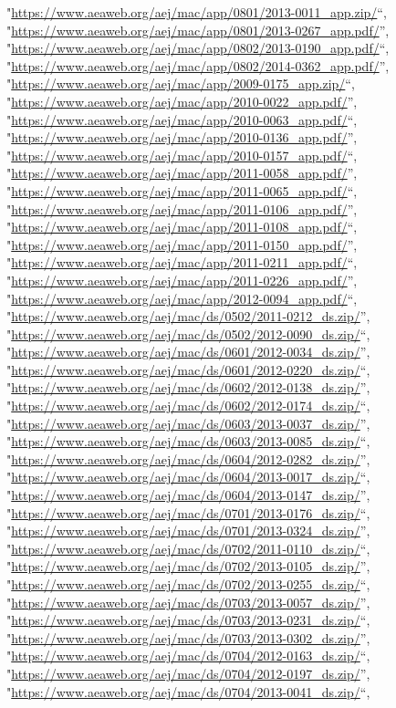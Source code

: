 \documentclass[]{article}
\begin{document}
\begin{itemize}
  "\url{https://www.aeaweb.org/aej/mac/app/0801/2013-0011_app.zip/}``,
  "\url{https://www.aeaweb.org/aej/mac/app/0801/2013-0267_app.pdf/}'',
  "\url{https://www.aeaweb.org/aej/mac/app/0802/2013-0190_app.pdf/}``,
  "\url{https://www.aeaweb.org/aej/mac/app/0802/2014-0362_app.pdf/}'',
  "\url{https://www.aeaweb.org/aej/mac/app/2009-0175_app.zip/}``,
  "\url{https://www.aeaweb.org/aej/mac/app/2010-0022_app.pdf/}'',
  "\url{https://www.aeaweb.org/aej/mac/app/2010-0063_app.pdf/}``,
  "\url{https://www.aeaweb.org/aej/mac/app/2010-0136_app.pdf/}'',
  "\url{https://www.aeaweb.org/aej/mac/app/2010-0157_app.pdf/}``,
  "\url{https://www.aeaweb.org/aej/mac/app/2011-0058_app.pdf/}'',
  "\url{https://www.aeaweb.org/aej/mac/app/2011-0065_app.pdf/}``,
  "\url{https://www.aeaweb.org/aej/mac/app/2011-0106_app.pdf/}'',
  "\url{https://www.aeaweb.org/aej/mac/app/2011-0108_app.pdf/}``,
  "\url{https://www.aeaweb.org/aej/mac/app/2011-0150_app.pdf/}'',
  "\url{https://www.aeaweb.org/aej/mac/app/2011-0211_app.pdf/}``,
  "\url{https://www.aeaweb.org/aej/mac/app/2011-0226_app.pdf/}'',
  "\url{https://www.aeaweb.org/aej/mac/app/2012-0094_app.pdf/}``,
  "\url{https://www.aeaweb.org/aej/mac/ds/0502/2011-0212_ds.zip/}'',
  "\url{https://www.aeaweb.org/aej/mac/ds/0502/2012-0090_ds.zip/}``,
  "\url{https://www.aeaweb.org/aej/mac/ds/0601/2012-0034_ds.zip/}'',
  "\url{https://www.aeaweb.org/aej/mac/ds/0601/2012-0220_ds.zip/}``,
  "\url{https://www.aeaweb.org/aej/mac/ds/0602/2012-0138_ds.zip/}'',
  "\url{https://www.aeaweb.org/aej/mac/ds/0602/2012-0174_ds.zip/}``,
  "\url{https://www.aeaweb.org/aej/mac/ds/0603/2013-0037_ds.zip/}'',
  "\url{https://www.aeaweb.org/aej/mac/ds/0603/2013-0085_ds.zip/}``,
  "\url{https://www.aeaweb.org/aej/mac/ds/0604/2012-0282_ds.zip/}'',
  "\url{https://www.aeaweb.org/aej/mac/ds/0604/2013-0017_ds.zip/}``,
  "\url{https://www.aeaweb.org/aej/mac/ds/0604/2013-0147_ds.zip/}'',
  "\url{https://www.aeaweb.org/aej/mac/ds/0701/2013-0176_ds.zip/}``,
  "\url{https://www.aeaweb.org/aej/mac/ds/0701/2013-0324_ds.zip/}'',
  "\url{https://www.aeaweb.org/aej/mac/ds/0702/2011-0110_ds.zip/}``,
  "\url{https://www.aeaweb.org/aej/mac/ds/0702/2013-0105_ds.zip/}'',
  "\url{https://www.aeaweb.org/aej/mac/ds/0702/2013-0255_ds.zip/}``,
  "\url{https://www.aeaweb.org/aej/mac/ds/0703/2013-0057_ds.zip/}'',
  "\url{https://www.aeaweb.org/aej/mac/ds/0703/2013-0231_ds.zip/}``,
  "\url{https://www.aeaweb.org/aej/mac/ds/0703/2013-0302_ds.zip/}'',
  "\url{https://www.aeaweb.org/aej/mac/ds/0704/2012-0163_ds.zip/}``,
  "\url{https://www.aeaweb.org/aej/mac/ds/0704/2012-0197_ds.zip/}'',
  "\url{https://www.aeaweb.org/aej/mac/ds/0704/2013-0041_ds.zip/}``,

\end{itemize}
\end{document}

